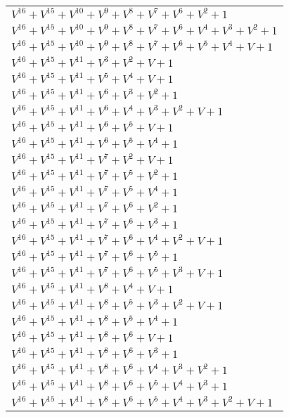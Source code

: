 \documentclass[12pt]{article}
\begin{document}
\begin{adjustwidth}{-4cm}{}
\begin{center}
\begin{longtable}{|l|}
$V^{16}  +V^{15}  +V^{10}  +V^{9}  +V^{8}  +V^{7}  +V^{6}  +V^{2}  + 1$ \\
$V^{16}  +V^{15}  +V^{10}  +V^{9}  +V^{8}  +V^{7}  +V^{6}  +V^{4}  +V^{3}  +V^{2}  + 1$ \\
$V^{16}  +V^{15}  +V^{10}  +V^{9}  +V^{8}  +V^{7}  +V^{6}  +V^{5}  +V^{4}  + V + 1$ \\
$V^{16}  +V^{15}  +V^{11}  +V^{3}  +V^{2}  + V + 1$ \\
$V^{16}  +V^{15}  +V^{11}  +V^{5}  +V^{4}  + V + 1$ \\
$V^{16}  +V^{15}  +V^{11}  +V^{6}  +V^{3}  +V^{2}  + 1$ \\
$V^{16}  +V^{15}  +V^{11}  +V^{6}  +V^{4}  +V^{3}  +V^{2}  + V + 1$ \\
$V^{16}  +V^{15}  +V^{11}  +V^{6}  +V^{5}  + V + 1$ \\
$V^{16}  +V^{15}  +V^{11}  +V^{6}  +V^{5}  +V^{4}  + 1$ \\
$V^{16}  +V^{15}  +V^{11}  +V^{7}  +V^{2}  + V + 1$ \\
$V^{16}  +V^{15}  +V^{11}  +V^{7}  +V^{5}  +V^{2}  + 1$ \\
$V^{16}  +V^{15}  +V^{11}  +V^{7}  +V^{5}  +V^{4}  + 1$ \\
$V^{16}  +V^{15}  +V^{11}  +V^{7}  +V^{6}  +V^{2}  + 1$ \\
$V^{16}  +V^{15}  +V^{11}  +V^{7}  +V^{6}  +V^{3}  + 1$ \\
$V^{16}  +V^{15}  +V^{11}  +V^{7}  +V^{6}  +V^{4}  +V^{2}  + V + 1$ \\
$V^{16}  +V^{15}  +V^{11}  +V^{7}  +V^{6}  +V^{5}  + 1$ \\
$V^{16}  +V^{15}  +V^{11}  +V^{7}  +V^{6}  +V^{5}  +V^{3}  + V + 1$ \\
$V^{16}  +V^{15}  +V^{11}  +V^{8}  +V^{4}  + V + 1$ \\
$V^{16}  +V^{15}  +V^{11}  +V^{8}  +V^{5}  +V^{3}  +V^{2}  + V + 1$ \\
$V^{16}  +V^{15}  +V^{11}  +V^{8}  +V^{5}  +V^{4}  + 1$ \\
$V^{16}  +V^{15}  +V^{11}  +V^{8}  +V^{6}  + V + 1$ \\
$V^{16}  +V^{15}  +V^{11}  +V^{8}  +V^{6}  +V^{3}  + 1$ \\
$V^{16}  +V^{15}  +V^{11}  +V^{8}  +V^{6}  +V^{4}  +V^{3}  +V^{2}  + 1$ \\
$V^{16}  +V^{15}  +V^{11}  +V^{8}  +V^{6}  +V^{5}  +V^{4}  +V^{3}  + 1$ \\
$V^{16}  +V^{15}  +V^{11}  +V^{8}  +V^{6}  +V^{5}  +V^{4}  +V^{3}  +V^{2}  + V + 1$ \\

\end{longtable}
\end{center}
\end{adjustwidth}
\end{document}
